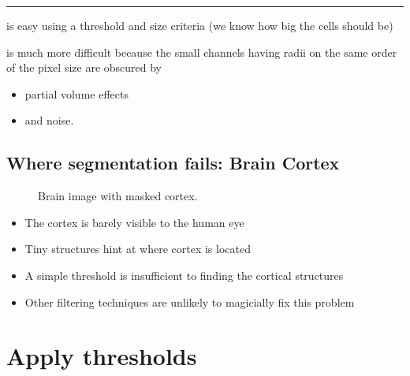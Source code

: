 \documentclass[letterpaper,10pt,english]{sphinxmanual}
\begin{document}
\bigskip\hrule\bigskip


\sphinxAtStartPar
{}
is easy using a threshold and size criteria (we know how big the cells should be)

\sphinxAtStartPar
{}
is much more difficult because the small channels having radii on the same order of the pixel size are obscured by
\begin{itemize}
\item {} 
\sphinxAtStartPar
partial volume effects

\item {} 
\sphinxAtStartPar
and noise.

\end{itemize}


\section{Where segmentation fails: Brain Cortex}
\label{\detokenize{05-AdvancedSegmentation:where-segmentation-fails-brain-cortex}}
\begin{figure}[htbp]
\centering
\capstart

\noindent{}
\caption{Brain image with masked cortex.}\label{\detokenize{05-AdvancedSegmentation:id4}}\end{figure}


\begin{itemize}
\item {} 
\sphinxAtStartPar
The cortex is barely visible to the human eye

\item {} 
\sphinxAtStartPar
Tiny structures hint at where cortex is located

\end{itemize}

\sphinxAtStartPar
{}
\begin{itemize}
\item {} 
\sphinxAtStartPar
A simple threshold is insufficient to finding the cortical structures

\item {} 
\sphinxAtStartPar
Other filtering techniques are unlikely to magicially fix this problem

\end{itemize}


\chapter{Apply thresholds}
\label{\detokenize{05-AdvancedSegmentation:apply-thresholds}}
\begin{sphinxVerbatim}[commandchars=\\\{\}]
   
\end{sphinxVerbatim}
\end{document}
